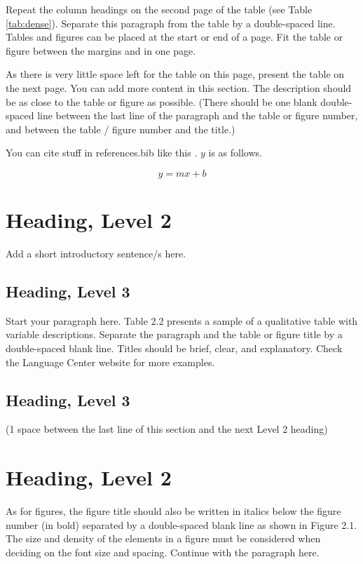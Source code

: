 Repeat the column headings on the second page of the table (see Table \ref{tab:dense}). Separate this paragraph from the table by a double-spaced line. Tables and figures can be placed at the start or end of a page. Fit the table or figure between the margins and in one page.

As there is very little space left for the table on this page, present the table on the next page.  You can add more content in this section.  The description should be as close to the table or figure as possible.
(There should be one blank double-spaced line between the last line of the paragraph and the table or figure number, and between the table / figure number and the title.)

You can cite stuff in references.bib like this \citep{doge}. $y$ is as follows.

\begin{equation}
    y = mx+b
\end{equation}

\section{Heading, Level 2}

Add a short introductory sentence/s here.

\subsection{Heading, Level 3}

Start your paragraph here. Table 2.2 presents a sample of a qualitative table with variable descriptions. Separate the paragraph and the table or figure title by a double-spaced blank line. Titles should be brief, clear, and explanatory.  Check the Language Center website for more examples.

\subsection{Heading, Level 3}

(1 space between the last line of this section and the next Level 2 heading)

\section{Heading, Level 2}
As for figures, the figure title should also be written in italics below the figure number (in bold) separated by a double-spaced blank line as shown in Figure 2.1.  The size and density of the elements in a figure must be considered when deciding on the font size and spacing.   Continue with the paragraph here.

